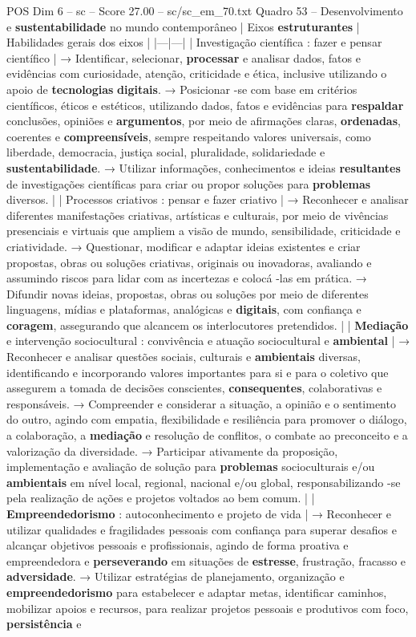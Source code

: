 \begin{textsample}{POS Dim 6 – sc – Score 27.00 – sc/sc\_em\_70.txt}  \label{ex:f6_pos_009}
Quadro 53 – Desenvolvimento e \textbf{sustentabilidade} no mundo contemporâneo | Eixos \textbf{estruturantes} | Habilidades gerais dos eixos | |---|---| | Investigação científica : fazer e pensar científico | → Identificar, selecionar, \textbf{processar} e analisar dados, fatos e evidências com curiosidade, atenção, criticidade e ética, inclusive utilizando o apoio de \textbf{tecnologias} \textbf{digitais}. → Posicionar -se com base em critérios científicos, éticos e estéticos, utilizando dados, fatos e evidências para \textbf{respaldar} conclusões, opiniões e \textbf{argumentos}, por meio de afirmações claras, \textbf{ordenadas}, coerentes e \textbf{compreensíveis}, sempre respeitando valores universais, como liberdade, democracia, justiça social, pluralidade, solidariedade e \textbf{sustentabilidade}. → Utilizar informações, conhecimentos e ideias \textbf{resultantes} de investigações científicas para criar ou propor soluções para \textbf{problemas} diversos. | | Processos criativos : pensar e fazer criativo | → Reconhecer e analisar diferentes manifestações criativas, artísticas e culturais, por meio de vivências presenciais e virtuais que ampliem a visão de mundo, sensibilidade, criticidade e criatividade. → Questionar, modificar e adaptar ideias existentes e criar propostas, obras ou soluções criativas, originais ou inovadoras, avaliando e assumindo riscos para lidar com as incertezas e colocá -las em prática. → Difundir novas ideias, propostas, obras ou soluções por meio de diferentes linguagens, mídias e plataformas, analógicas e \textbf{digitais}, com confiança e \textbf{coragem}, assegurando que alcancem os interlocutores pretendidos. | | \textbf{Mediação} e intervenção sociocultural : convivência e atuação sociocultural e \textbf{ambiental} | → Reconhecer e analisar questões sociais, culturais e \textbf{ambientais} diversas, identificando e incorporando valores importantes para si e para o coletivo que assegurem a tomada de decisões conscientes, \textbf{consequentes}, colaborativas e responsáveis. → Compreender e considerar a situação, a opinião e o sentimento do outro, agindo com empatia, flexibilidade e resiliência para promover o diálogo, a colaboração, a \textbf{mediação} e resolução de conflitos, o combate ao preconceito e a valorização da diversidade. → Participar ativamente da proposição, implementação e avaliação de solução para \textbf{problemas} socioculturais e/ou \textbf{ambientais} em nível local, regional, nacional e/ou global, responsabilizando -se pela realização de ações e projetos voltados ao bem comum. | | \textbf{Empreendedorismo} : autoconhecimento e projeto de vida | → Reconhecer e utilizar qualidades e fragilidades pessoais com confiança para superar desafios e alcançar objetivos pessoais e profissionais, agindo de forma proativa e empreendedora e \textbf{perseverando} em situações de \textbf{estresse}, frustração, fracasso e \textbf{adversidade}. → Utilizar estratégias de planejamento, organização e \textbf{empreendedorismo} para estabelecer e adaptar metas, identificar caminhos, mobilizar apoios e recursos, para realizar projetos pessoais e produtivos com foco, \textbf{persistência} e 
\end{textsample}
